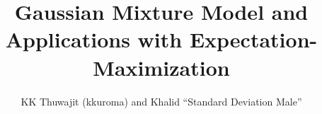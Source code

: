 \documentclass{article}
\title{Gaussian Mixture Model and Applications with Expectation-Maximization}
\author{KK Thuwajit (kkuroma) and Khalid ``Standard Deviation Male''}
\begin{document}
\newtheorem{theorem}{Theorem}
\newtheorem{lemma}{Lemma}
\theoremstyle{definition}
\newtheorem{definition}{Definition}
\newtheorem{example}{Example}
\maketitle
\tableofcontents
\newpage








\end{document}
